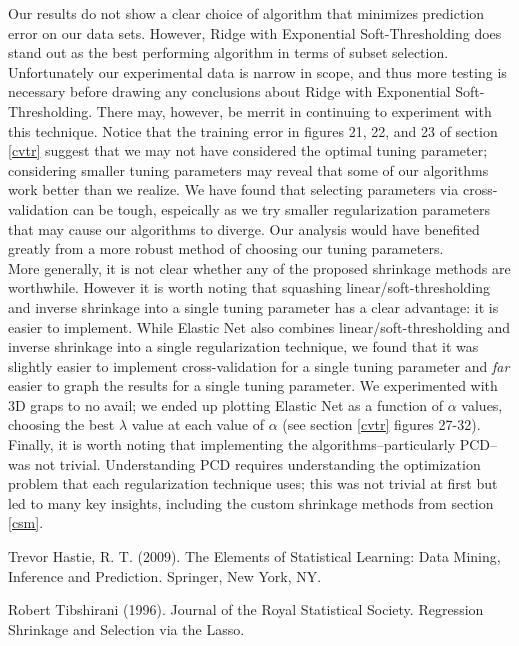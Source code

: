 \documentclass[11pt]{article}
\begin{document}
Our results do not show a clear choice of algorithm that minimizes prediction error on our data sets.  However, Ridge with Exponential Soft-Thresholding does stand out as the best performing algorithm in terms of subset selection.  Unfortunately our experimental data is narrow in scope, and thus more testing is necessary before drawing any conclusions about Ridge with Exponential Soft-Thresholding.  There may, however, be merrit in continuing to experiment with this technique.  Notice that the training error in figures 21, 22, and 23 of section \ref{cvtr} suggest that we may not have considered the optimal tuning parameter; considering smaller tuning parameters may reveal that some of our algorithms work better than we realize.  We have found that selecting parameters via cross-validation can be tough, espeically as we try smaller regularization parameters that may cause our algorithms to diverge.  Our analysis would have benefited greatly from a more robust method of choosing our tuning parameters.  \\

More generally, it is not clear whether any of the proposed shrinkage methods are worthwhile.  However it is worth noting that squashing linear/soft-thresholding and inverse shrinkage into a single tuning parameter has a clear advantage: it is easier to implement.  While Elastic Net also combines linear/soft-thresholding and inverse shrinkage into a single regularization technique, we found that it was slightly easier to implement cross-validation for a single tuning parameter and \textit{far} easier to graph the results for a single tuning parameter.  We experimented with 3D graps to no avail; we ended up plotting Elastic Net as a function of $\alpha$ values, choosing the best $\lambda$ value at each value of $\alpha$ (see section \ref{cvtr} figures 27-32).  \\

Finally, it is worth noting that implementing the algorithms--particularly PCD--was not trivial.  Understanding PCD requires understanding the optimization problem that each regularization technique uses; this was not trivial at first but led to many key insights, including the custom shrinkage methods from section \ref{csm}.  


\begin{thebibliography}{9}
Trevor Hastie, R. T. (2009). The Elements of Statistical Learning: Data Mining, Inference and Prediction. Springer, New York, NY.

Robert Tibshirani (1996).  Journal of the Royal Statistical Society.  Regression Shrinkage and Selection via the Lasso. 

\end{thebibliography}
\end{document}

